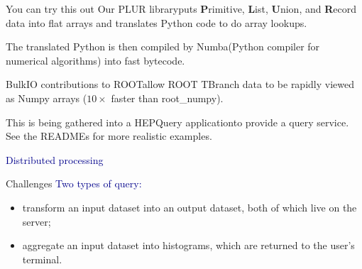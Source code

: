 \documentclass{beamer}
\begin{document}
\begin{frame}{You can try this out}
Our PLUR library\footnotemark[1] puts {\bf P}rimitive, {\bf L}ist, {\bf U}nion, and {\bf R}ecord data into flat arrays and translates Python code to do array lookups.

\vspace{0.5 cm}
The translated Python is then compiled by Numba\footnotemark[2] (Python compiler for numerical algorithms) into fast bytecode.

\vspace{0.5 cm}
BulkIO contributions to ROOT\footnotemark[3] allow ROOT TBranch data to be rapidly viewed as Numpy arrays ($10\times$ faster than root\_numpy).

\vspace{0.5 cm}
This is being gathered into a HEPQuery application\footnotemark[4] to provide a query service. See the READMEs for more realistic examples.

\end{frame}

\begin{frame}
\begin{center}
\huge \textcolor{darkblue}{Distributed processing}
\end{center}
\end{frame}

\begin{frame}{Challenges}
\vspace{0.5 cm}
\textcolor{darkblue}{Two types of query:}
\begin{itemize}
\item transform an input dataset into an output dataset, both of which live on the server;
\item aggregate an input dataset into histograms, which are returned to the user's terminal.
\end{itemize}

\vspace{0.5 cm}

\vspace{0.5 cm}

\vspace{0.5 cm}
\end{frame}
\end{document}
